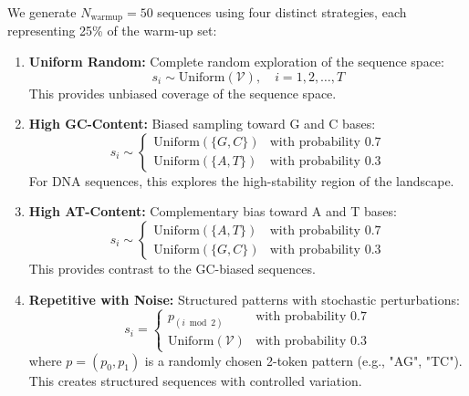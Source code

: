 \documentclass[conference]{IEEEtran}
\begin{document}
We generate $N_{\text{warmup}} = 50$ sequences using four distinct strategies, each representing 25\% of the warm-up set:

\begin{enumerate}
    \item \textbf{Uniform Random:} Complete random exploration of the sequence space:
    \begin{equation}
    s_i \sim \text{Uniform}(\mathcal{V}), \quad i = 1, 2, \ldots, T
    \end{equation}
    This provides unbiased coverage of the sequence space.
    
    \item \textbf{High GC-Content:} Biased sampling toward G and C bases:
    \begin{equation}
    s_i \sim \begin{cases}
    \text{Uniform}(\{G, C\}) & \text{with probability } 0.7 \\
    \text{Uniform}(\{A, T\}) & \text{with probability } 0.3
    \end{cases}
    \end{equation}
    For DNA sequences, this explores the high-stability region of the landscape.
    
    \item \textbf{High AT-Content:} Complementary bias toward A and T bases:
    \begin{equation}
    s_i \sim \begin{cases}
    \text{Uniform}(\{A, T\}) & \text{with probability } 0.7 \\
    \text{Uniform}(\{G, C\}) & \text{with probability } 0.3
    \end{cases}
    \end{equation}
    This provides contrast to the GC-biased sequences.
    
    \item \textbf{Repetitive with Noise:} Structured patterns with stochastic perturbations:
    \begin{equation}
    s_i = \begin{cases}
    p_{(i \bmod 2)} & \text{with probability } 0.7 \\
    \text{Uniform}(\mathcal{V}) & \text{with probability } 0.3
    \end{cases}
    \end{equation}
    where $p = (p_0, p_1)$ is a randomly chosen 2-token pattern (e.g., "AG", "TC"). This creates structured sequences with controlled variation.
\end{enumerate}
\end{document}
